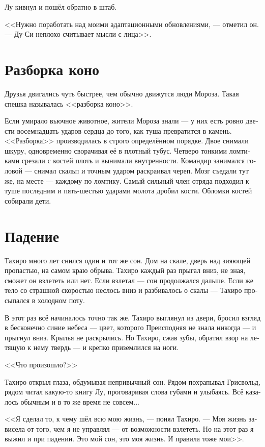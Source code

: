 \documentclass[a4paper,12pt,fleqn]{book}\usepackage{cooltooltips}\usepackage{polyglossia}\setdefaultlanguage[babelshorthands=true]{russian}\setotherlanguage{english}\defaultfontfeatures{Ligatures=TeX,Mapping=tex-text} \usepackage{xcolor}\definecolor{lightgray}{HTML}{bbbbbb}\color{lightgray}\newcommand{\ml}[3]{\textenglish{\textcolor{black}{#3}}}
\begin{document}
{Лу кивнул и пошёл обратно в штаб.

<<Нужно поработать над моими адаптационными обновлениями, --- отметил он.
--- Ду-Си неплохо считывает мысли с лица>>.

\section{Разборка коно}

Друзья двигались чуть быстрее, чем обычно движутся люди Мороза.
Такая спешка называлась <<разборка коно>>.

Если умирало вьючное животное, жители Мороза знали --- у них есть ровно двести восемнадцать ударов сердца до того, как туша превратится в камень.
<<Разборка>> производилась в строго определённом порядке.
Двое снимали шкуру, одновременно сворачивая её в плотный тубус.
Четверо тонкими ломтиками срезали с костей плоть и вынимали внутренности.
Командир занимался головой --- снимал скальп и точным ударом раскраивал череп.
Мозг съедали тут же, на месте --- каждому по ломтику.
Самый сильный член отряда подходил к туше последним и пять-шестью ударами молота дробил кости.
Обломки костей собирали дети.

\section{Падение}

Тахиро много лет снился один и тот же сон.
Дом на скале, дверь над зияющей пропастью, на самом краю обрыва.
Тахиро каждый раз прыгал вниз, не зная, сможет он взлететь или нет.
Если взлетал --- сон продолжался дальше.
Если же тело со страшной скоростью неслось вниз и разбивалось о скалы --- Тахиро просыпался в холодном поту.

В этот раз всё начиналось точно так же.
Тахиро выглянул из двери, бросил взгляд в бесконечно синие небеса --- цвет, которого Преисподняя не знала никогда --- и прыгнул вниз.
Крылья не раскрылись.
Но Тахиро, сжав зубы, обратил взор на летящую к нему твердь --- и крепко приземлился на ноги.

<<Что произошло?>>

Тахиро открыл глаза, обдумывая непривычный сон.
Рядом похрапывал Грисвольд, рядом читал какую-то книгу Лу, проговаривая слова губами и улыбаясь.
Всё казалось обычным и в то же время не совсем...

<<Я сделал то, к чему шёл всю мою жизнь, --- понял Тахиро.
--- Моя жизнь зависела от того, чем я не управлял --- от возможности взлететь.
Но на этот раз я выжил и при падении.
Это мой сон, это моя жизнь.
И правила тоже мои>>.

}
\end{document}
